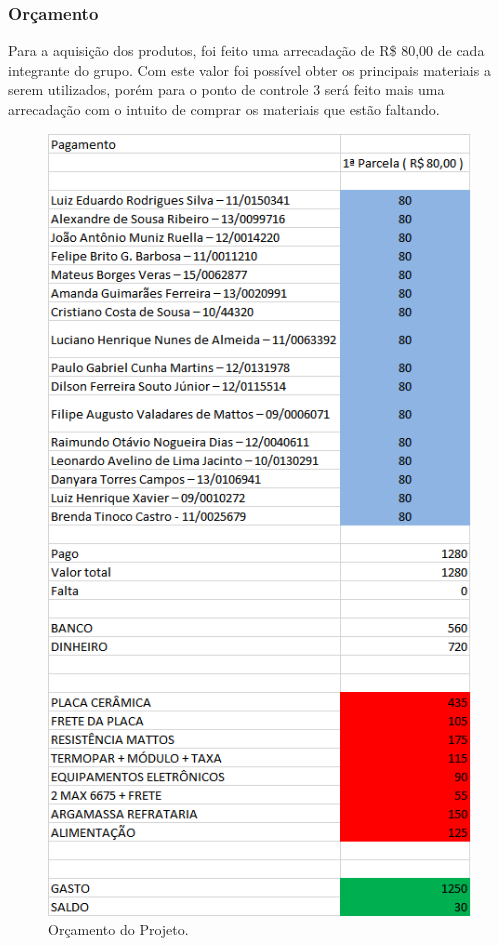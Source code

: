 \subsubsection{Orçamento}
Para a aquisição dos produtos, foi feito uma arrecadação de R\$ 80,00 de cada integrante do grupo. Com este valor foi possível obter os principais materiais a serem utilizados, porém para o ponto de controle 3 será feito mais uma arrecadação com o intuito de comprar os materiais que estão faltando.

\begin{figure}[ht]
	\centering
	\label{custo}
	\includegraphics[keepaspectratio=true,scale=0.8]{figuras/orcamento.jpg}
	\caption{Orçamento do Projeto.}
\end{figure}

